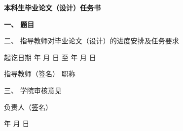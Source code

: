 {
  \setlength{\parindent}{0em}
  \linespread{1}

  \vspace*{-2.2em}

  {
    \centering
    \songti\erhao\bfseries
    本科生毕业论文（设计）任务书 \par
  }

  \vspace{2.1em}

  {
    \songti\xiaosi\bfseries
    一、 \; 题目 \; \underline{\makebox[24em]{\zjutitlec}}

    \vspace{1.1em}

    二、 \; 指导教师对毕业论文（设计）的进度安排及任务要求

    \vspace{15.5em}

    \hfill 起讫日期 \hspace{2em} 年 \hspace{1em} 月 \hspace{1em} 日 \; 至 \hspace{2em} 年 \hspace{1em} 月 \hspace{1em} 日

    \vspace{1.3em}

    \hfill 指导教师（签名） \; \underline{\hspace{4em}} \; 职称 \; \underline{\hspace{4em}}

    \vspace{2.35em}

    三、 \; 学院审核意见

    \vspace{13.95em}

    \hfill 负责人（签名） \; \underline{\hspace{4em}}

    \vspace{1.3em}

    \hfill \hspace{2em} 年 \hspace{1em} 月 \hspace{1em} 日 \par
  }
}
